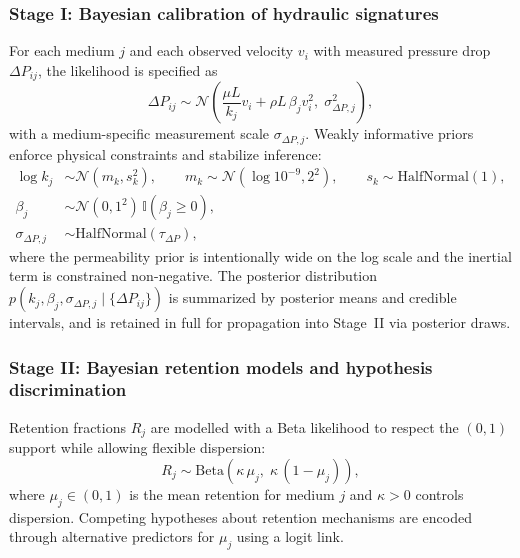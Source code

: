 \documentclass[11pt]{article}
\begin{document}
\subsubsection{Stage I: Bayesian calibration of hydraulic signatures}
For each medium $j$ and each observed velocity $v_{i}$ with measured pressure drop $\Delta P_{ij}$, the likelihood is specified as
\begin{equation}
\Delta P_{ij} \sim \mathcal{N}\!\left(\frac{\mu L}{k_j}v_i + \rho L\,\beta_j v_i^2,\;\sigma_{\Delta P,j}^2\right),
\end{equation}
with a medium-specific measurement scale $\sigma_{\Delta P,j}$. Weakly informative priors enforce physical constraints and stabilize inference:
\begin{align}
\log k_j &\sim \mathcal{N}(m_k, s_k^2), \qquad m_k \sim \mathcal{N}(\log 10^{-9}, 2^2), \qquad s_k \sim \mathrm{HalfNormal}(1), \\
\beta_j &\sim \mathcal{N}(0, 1^2)\,\mathbb{I}(\beta_j\ge 0), \\
\sigma_{\Delta P,j} &\sim \mathrm{HalfNormal}(\tau_{\Delta P}),
\end{align}
where the permeability prior is intentionally wide on the log scale and the inertial term is constrained non-negative. The posterior distribution $p(k_j,\beta_j,\sigma_{\Delta P,j}\mid \{\Delta P_{ij}\})$ is summarized by posterior means and credible intervals, and is retained in full for propagation into Stage~II via posterior draws.

\subsubsection{Stage II: Bayesian retention models and hypothesis discrimination}
Retention fractions $R_j$ are modelled with a Beta likelihood to respect the $(0,1)$ support while allowing flexible dispersion:
\begin{equation}
R_j \sim \mathrm{Beta}\!\left(\kappa\,\mu_j,\; \kappa\,(1-\mu_j)\right),
\end{equation}
where $\mu_j\in(0,1)$ is the mean retention for medium $j$ and $\kappa>0$ controls dispersion. Competing hypotheses about retention mechanisms are encoded through alternative predictors for $\mu_j$ using a logit link.
\end{document}
